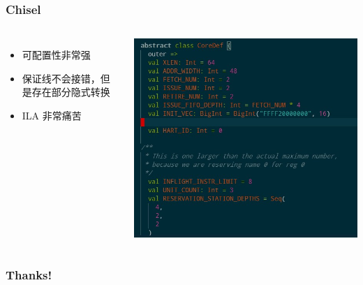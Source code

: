\documentclass[UTF-8]{ctexbeamer}
\begin{document}
\begin{frame}
  \frametitle{Chisel}
  \begin{columns}
    \begin{itemize}
      \item 可配置性非常强
      \item 保证线不会接错，但是存在部分隐式转换
      \item ILA 非常痛苦
    \end{itemize}
    \begin{center}
      \includegraphics[width=\textwidth]{assets/def.jpg}
    \end{center}
  \end{columns}
\end{frame}

\begin{frame}
  \frametitle{Thanks!}
\end{frame}
\end{document}
